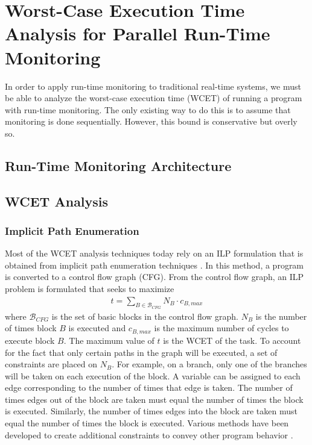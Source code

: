 \chapter{Worst-Case Execution Time Analysis for Parallel Run-Time Monitoring}
\label{chap:monitoring_wcet}

In order to apply run-time monitoring to traditional real-time systems, we must
be able to analyze the worst-case execution time (WCET) of running a program
with run-time monitoring. The only existing way to do this is to assume that
monitoring is done sequentially. However, this bound is conservative but overly so.

\section{Run-Time Monitoring Architecture}

\section{WCET Analysis}

\subsection{Implicit Path Enumeration}
\label{sec:formulation:ipet}

Most of the WCET analysis techniques today rely on an ILP formulation that is 
obtained from implicit path enumeration techniques \cite{li-ipet-dac95}. 
In this method, a program is converted to a control flow
graph (CFG). From the control flow graph, an ILP problem is formulated that
seeks to maximize
\begin{align*}
  t = \sum_{B \in \mathcal{B}_{CFG}}{N_B \cdot c_{B,max}}
\end{align*} 
where $\mathcal{B}_{CFG}$ is the set of basic blocks in the control flow graph. $N_{B}$
is the number of times block $B$ is executed and $c_{B,max}$ is the maximum number of cycles
to execute block $B$. The maximum value of $t$ is the WCET of the task.  To
account for the fact that only certain paths in the graph will be executed, a
set of constraints are placed on $N_{B}$. For example, on a branch, only one of
the branches will be taken on each execution
of the block. A variable can be assigned to each edge corresponding to the
number of times that edge is taken.
The number of times edges out of the block are taken must equal the number of
times the block is executed.
 Similarly,
the number of times edges into the block are taken must equal the number of
times the block is executed. Various methods have been developed to
create additional constraints to convey other program behavior \cite{li-ipet-dac95, wcetsurvey-tecs08}.

